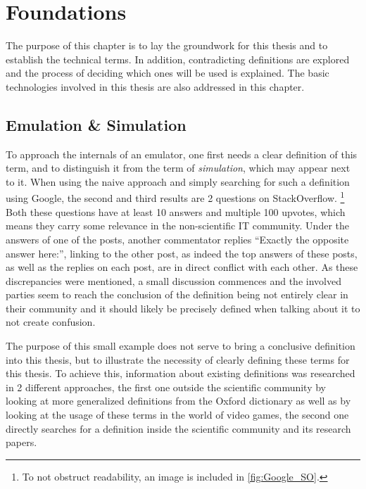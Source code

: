 \chapter{Foundations}\label{chap:Foundations}
The purpose of this chapter is to lay the groundwork for this thesis
and to establish the technical terms.
In addition, contradicting definitions are explored
and the process of deciding which ones will be used is explained.
The basic technologies involved in this thesis are also addressed in this chapter.

\section{Emulation \& Simulation}
To approach the internals of an emulator, one first needs a clear definition of this term,
and to distinguish it from the term of \emph{simulation}, which may appear next to it.
When using the naive approach and simply searching for such a definition using Google,
the second and third results are 2 questions on StackOverflow\cite{SO_link}\cite{SO}.
\footnote{To not obstruct readability, an image is included in \autoref{fig:Google_SO}.}
Both these questions have at least 10 answers and multiple 100 upvotes,
which means they carry some relevance in the non-scientific IT community.
Under the answers of one of the posts, another commentator replies
\enquote{Exactly the opposite answer here:}\cite{SO_link},
linking to the other post\cite{SO},
as indeed the top answers of these posts, as well as the replies on each post,
are in direct conflict with each other.
As these discrepancies were mentioned,
a small discussion commences and the involved parties seem to reach the conclusion
of the definition being not entirely clear in their community and it should likely be precisely defined when talking about it
to not create confusion.

The purpose of this small example does not serve to bring a conclusive definition into this thesis,
but to illustrate the necessity of clearly defining these terms for this thesis.
To achieve this, information about existing definitions was researched in 2 different approaches,
the first one outside the scientific community by looking at more generalized definitions from the Oxford dictionary
as well as by looking at the usage of these terms in the world of video games,
the second one directly searches for a definition inside the scientific community and its research papers.

